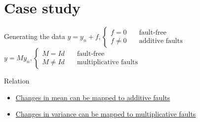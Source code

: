 \documentclass[10pt]{beamer}
\begin{document}
\section{Case study}
\begin{frame}{Generating the data}
    $y = y_n + f, \left\{ \begin{aligned}
    f = 0      \quad &\text{fault-free} \\
    f \neq 0   \quad &\text{additive faults}
     \end{aligned} 
     \right. $
   $y = My_n,\left\{ \begin{aligned}
    M = Id     \quad &\text{fault-free} \\
    M \neq Id   \quad &\text{multiplicative faults}
     \end{aligned} 
     \right. $
      \begin{exampleblock}{Relation}
	\begin{itemize}
    \item \href{https://ieeexplore.ieee.org/document/8425029}{Changes in mean can be mapped to additive faults} 
    \item \href{https://ieeexplore.ieee.org/document/8425029}{Changes in variance can be mapped to multiplicative faults}
    \end{itemize}
    \end{exampleblock}
    
\end{frame}
\end{document}
